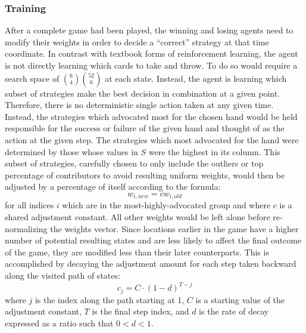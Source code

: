 
\subsubsection{Training}
\label{sec:dm-methods-training}





After a complete game had been played, the winning and losing agents need to
modify their weights in order to decide a ``correct'' strategy at that time
coordinate.
%
In contrast with textbook forms of reinforcement learning,
the agent is not directly learning which cards to take and throw.
%
To do so would require a search space of ${6 \choose 4}{52 \choose 6}$
at each state.
%
Instead, the agent is learning which subset of strategies make the best
decision in combination at a given point.
%
Therefore, there is no deterministic single action taken at any given
time.
%
Instead, the strategies which advocated most for the chosen hand would be held
responsible for the success or failure of the given hand and thought of as
the action at the given step.
%
The strategies which most advocated for the hand were determined by those whose
values in $S$ were the highest in its column.
%
This subset of strategies,
carefully chosen to only include the outliers or top percentage of contributors
to avoid resulting uniform weights,
would then be adjusted by a percentage of itself according to the formula:
\[
	w_{i,new} = c w_{i,old}
\]
for all indices $i$ which are in the most-highly-advocated group and
where $c$ is a shared adjustment constant.
%
All other weights would be left alone before re-normalizing the weights vector.
%
Since locations earlier in the game have a higher number of potential resulting
states and are less likely to affect the final outcome of the game,
they are modified less than their later counterparts.
%
This is accomplished by decaying the adjustment amount for each step taken
backward along the visited path of states:
\[
	c_j = C \cdot (1 - d)^{T-j}
\]
where $j$ is the index along the path starting at 1,
$C$ is a starting value of the adjustment constant,
$T$ is the final step index,
and $d$ is the rate of decay expressed as a ratio such that $0 < d < 1$.

